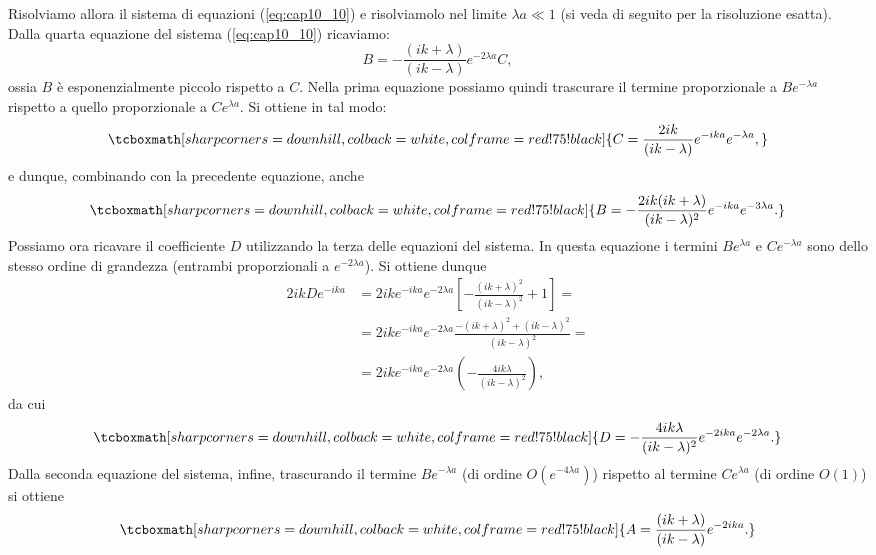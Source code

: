 Risolviamo allora il sistema di equazioni (\ref{eq:cap10_10}) e risolviamolo nel limite ${\lambda a \ll 1}$ (si veda di seguito per la risoluzione esatta). Dalla quarta equazione del sistema (\ref{eq:cap10_10}) ricaviamo:
	\begin{equation}
		B=-\frac{(ik+\lambda)}{(ik-\lambda)}e^{-2 \lambda a } C,
	\end{equation}
ossia $B$ è esponenzialmente piccolo rispetto a $C$.  Nella prima equazione possiamo quindi trascurare il termine proporzionale a $Be^{-\lambda a}$ rispetto a quello proporzionale a $Ce^{\lambda a }$. Si ottiene in tal modo:
	\begin{equation}
		\tcboxmath[sharp corners=downhill, colback=white, colframe=red!75!black]{
			C= \frac{2ik}{(ik-\lambda)}e^{-ika}e^{-\lambda a},
			}
	\end{equation}
e dunque, combinando con la precedente equazione, anche
	\begin{equation}
		\tcboxmath[sharp corners=downhill, colback=white, colframe=red!75!black]{
			B=-\frac{2ik(ik+\lambda)}{(ik-\lambda)^2}e^{-ik a }e^{-3 \lambda a }.
			}
	\end{equation}
Possiamo ora ricavare il coefficiente $D$ utilizzando la terza delle equazioni del sistema. In questa equazione i termini $Be^{\lambda a }$ e $Ce^{-\lambda a }$ sono dello stesso ordine di grandezza (entrambi proporzionali a $e^{-2\lambda a}$). Si ottiene dunque
	\begin{align}
		2ikDe^{-ika}&= 2ike^{-ika}e^{-2\lambda a} \left[-\frac{(ik+\lambda)^2}{(ik-\lambda)^2}+1\right]= \nonumber \\
		&= 2ike^{-ika}e^{-2\lambda a}\frac{-(ik+\lambda)^2+(ik-\lambda)^2}{(ik-\lambda)^2}= \nonumber \\
		&= 2ike^{-ika}e^{-2\lambda a}\left( -\frac{4ik\lambda}{(ik-\lambda)^2}\right),
	\end{align}
da cui
	\begin{equation}
		\tcboxmath[sharp corners=downhill, colback=white, colframe=red!75!black]{
			D= -\frac{4ik\lambda}{(ik-\lambda)^2}e^{-2ika}e^{-2\lambda a}.
			}
	\end{equation}
Dalla seconda equazione del sistema, infine, trascurando il termine $Be^{-\lambda a}$ (di ordine $O(e^{-4\lambda a })$) rispetto al termine $Ce^{\lambda a}$ (di ordine $O(1)$) si ottiene
	\begin{equation}
		\tcboxmath[sharp corners=downhill, colback=white, colframe=red!75!black]{
			A=\frac{(ik+\lambda)}{(ik-\lambda)}e^{-2ika}.
			}
	\end{equation}\\
	
